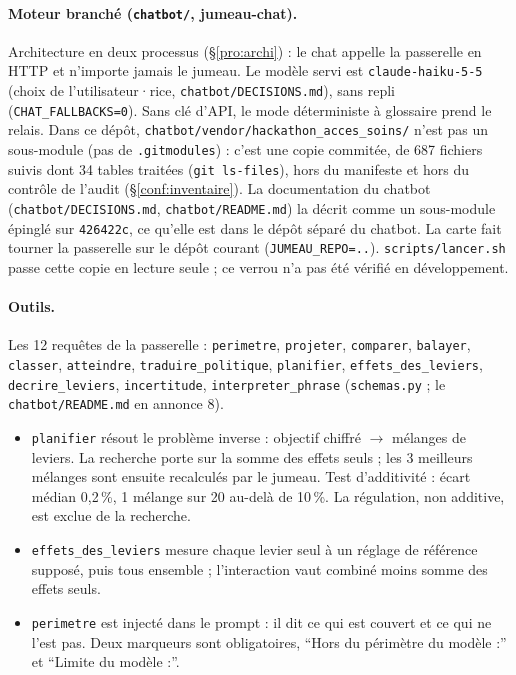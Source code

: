 \paragraph{Moteur branché (\texttt{chatbot/\allowbreak{}}, jumeau-chat).}
Architecture en deux processus (§\ref{pro:archi}) : le chat appelle la passerelle en HTTP et n'importe jamais le jumeau.
Le modèle servi est \texttt{claude-\allowbreak{}haiku-\allowbreak{}5-\allowbreak{}5} (choix de l'utilisateur·rice, \texttt{chatbot/\allowbreak{}DECISIONS.md}), sans repli (\texttt{CHAT\_\allowbreak{}FALLBACKS=0}). Sans clé d'API, le mode déterministe à glossaire prend le relais.
Dans ce dépôt, \texttt{chatbot/\allowbreak{}vendor/\allowbreak{}hackathon\_\allowbreak{}acces\_\allowbreak{}soins/\allowbreak{}} n'est pas un sous-module (pas de \texttt{.gitmodules}) : c'est une copie commitée, de 687\mesure{} fichiers suivis dont 34\mesure{} tables traitées (\texttt{git ls-files}), hors du manifeste et hors du contrôle de l'audit (§\ref{conf:inventaire}). La documentation du chatbot (\texttt{chatbot/\allowbreak{}DECISIONS.md}, \texttt{chatbot/\allowbreak{}README.md}) la décrit comme un sous-module épinglé sur \texttt{426422c}, ce qu'elle est dans le dépôt séparé du chatbot. La carte fait tourner la passerelle sur le dépôt courant (\texttt{JUMEAU\_\allowbreak{}REPO=..}). \texttt{scripts/\allowbreak{}lancer.sh} passe cette copie en lecture seule ; ce verrou n'a pas été vérifié en développement.

\paragraph{Outils.}
Les 12\mesure{} requêtes de la passerelle : \texttt{perimetre}, \texttt{projeter}, \texttt{comparer}, \texttt{balayer}, \texttt{classer}, \texttt{atteindre}, \texttt{traduire\_\allowbreak{}politique}, \texttt{planifier}, \texttt{effets\_\allowbreak{}des\_\allowbreak{}leviers}, \texttt{decrire\_\allowbreak{}leviers}, \texttt{incertitude}, \texttt{interpreter\_\allowbreak{}phrase} (\texttt{schemas.py} ; le \texttt{chatbot/\allowbreak{}README.md} en annonce 8\mesure{}).
\begin{itemize}
\item \texttt{planifier} résout le problème inverse : objectif chiffré $\rightarrow$ mélanges de leviers. La recherche porte sur la somme des effets seuls ; les 3\mesure{} meilleurs mélanges sont ensuite recalculés par le jumeau. Test d'additivité : écart médian 0,2\mesure{}\,\%, 1\mesure{} mélange sur 20\mesure{} au-delà de 10\,\%. La régulation, non additive, est exclue de la recherche.
\item \texttt{effets\_\allowbreak{}des\_\allowbreak{}leviers} mesure chaque levier seul à un réglage de référence supposé, puis tous ensemble ; l'interaction vaut combiné moins somme des effets seuls.
\item \texttt{perimetre} est injecté dans le prompt : il dit ce qui est couvert et ce qui ne l'est pas. Deux marqueurs sont obligatoires, \enquote{Hors du périmètre du modèle :} et \enquote{Limite du modèle :}.
\end{itemize}

